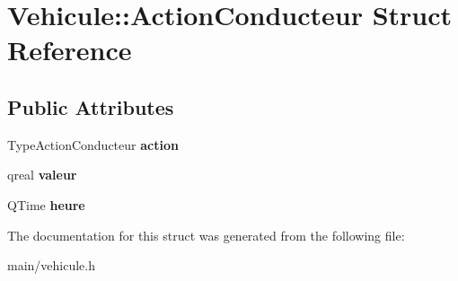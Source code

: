 \section{\-Vehicule\-:\-:\-Action\-Conducteur \-Struct \-Reference}
\label{struct_vehicule_1_1_action_conducteur}
\subsection*{\-Public \-Attributes}
\begin{DoxyCompactItemize}
\item 
\-Type\-Action\-Conducteur {\bfseries action}\label{struct_vehicule_1_1_action_conducteur_a1ea515ef351b445f085b2c746645bf19}

\item 
qreal {\bfseries valeur}\label{struct_vehicule_1_1_action_conducteur_a0e2583b4e55abd1e294b39faf5d9dd36}

\item 
\-Q\-Time {\bfseries heure}\label{struct_vehicule_1_1_action_conducteur_a7de5bee03218bf1e90b9e5863f079838}

\end{DoxyCompactItemize}


\-The documentation for this struct was generated from the following file\-:\begin{DoxyCompactItemize}
\item 
main/vehicule.\-h\end{DoxyCompactItemize}

